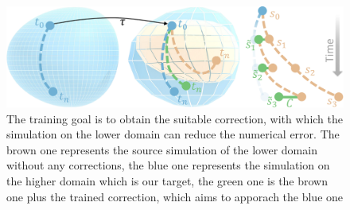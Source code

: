 \documentclass[a4paper,12pt,twoside]{report}
\begin{document}
\begin{figure}
\centering
\includegraphics[width=1.0\textwidth]{Manifolds.pdf}
\caption{The training goal is to obtain the suitable correction, with which the simulation on the lower domain can reduce the numerical error. The brown one represents the source simulation of the lower domain without any corrections, the blue one represents the simulation on the higher domain which is our target, the green one is the brown one plus the trained correction, which aims to apporach the blue one\cite{um2020sol}}
\end{figure}
\end{document}
